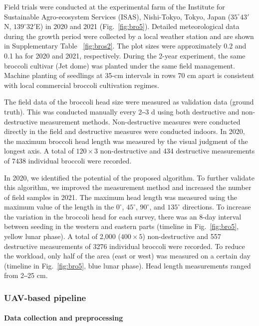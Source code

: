 Field trials were conducted at the experimental farm of the Institute for Sustainable Agro-ecosystem Services (ISAS), Nishi-Tokyo, Tokyo, Japan ($35^\circ 43'$N, $139^\circ 32'$E) in 2020 and 2021 (Fig.~\ref{fig:bro5}). Detailed meteorological data during the growth period were collected by a local weather station and are shown in Supplementary Table ~\ref{fig:bros2}. The plot sizes were approximately 0.2 and 0.1 ha for 2020 and 2021, respectively. During the 2-year experiment, the same broccoli cultivar (Jet dome) was planted under the same field management. Machine planting of seedlings at 35-cm intervals in rows 70 cm apart is consistent with local commercial broccoli cultivation regimes. 



The field data of the broccoli head size were measured as validation data (ground truth). This was conducted manually every 2‒3 d using both destructive and non-destructive measurement methods. Non-destructive measures were conducted directly in the field and destructive measures were conducted indoors. In 2020, the maximum broccoli head length was measured by the visual judgment of the longest axis. A total of $120 \times 3$ non-destructive and 434 destructive measurements of 7438 individual broccoli were recorded. 

In 2020, we identified the potential of the proposed algorithm. To further validate this algorithm, we improved the measurement method and increased the number of field samples in 2021. The maximum head length was measured using the maximum value of the length in the $0^\circ$, $45^\circ$, $90^\circ$, and $135^\circ$ directions. To increase the variation in the broccoli head for each survey, there was an 8-day interval between seeding in the western and eastern parts (timeline in Fig.~\ref{fig:bro5}, yellow lunar phase). A total of 2,000 ($400 \times 5$) non-destructive and 557 destructive measurements of 3276 individual broccoli were recorded. To reduce the workload, only half of the area (east or west) was measured on a certain day (timeline in Fig.~\ref{fig:bro5}, blue lunar phase). Head length measurements ranged from 2‒25 cm.

\subsubsection{UAV-based pipeline}

\paragraph{Data collection and preprocessing}


